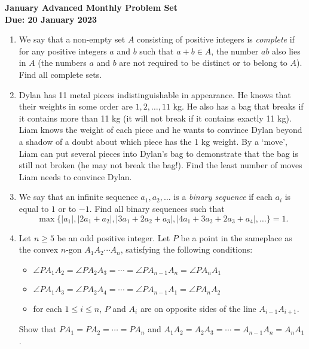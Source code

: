 \documentclass{article}
\newcommand{\abs}[1]{\left|#1\right|}
\begin{document}
\thispagestyle{empty}

\begin{center}
  \textbf{\Large January Advanced Monthly Problem Set}
  \\ \vspace{1em}
  \textbf{\large Due: 20 January 2023}
\end{center}

\bigskip

\begin{enumerate}[itemsep=\fill]

 
\item %
We say that a non-empty set $A$ consisting of positive integers is \textit{complete} if for any positive integers $a$ and $b$ such that $a+b\in A$, the number $ab$ also lies in $A$ (the numbers $a$ and $b$ are not required to be distinct or to belong to $A$). Find all complete sets.


\item %
Dylan has 11 metal pieces indistinguishable in appearance.
He knows that their weights in some order are $1,2,\dotsc,11$ kg.
He also has a bag that breaks if it contains more than 11 kg (it will not break if it contains exactly 11 kg).
Liam knows the weight of each piece and he wants to convince Dylan beyond a shadow of a doubt about which piece has the 1 kg weight.
By a `move', Liam can put several pieces into Dylan's bag to demonstrate that the bag is still not broken (he may not break the bag!).
Find the least number of moves Liam needs to convince Dylan.


\item %
We say that an infinite sequence $a_1, a_2, \dotsc$ is a \emph{binary sequence} if each $a_i$ is equal to $1$ or to $-1$.
Find all binary sequences such that \[ \max\{\abs{a_1}, \abs{2a_1+a_2}, \abs{3a_1+2a_2+a_3}, \abs{4a_1+3a_2+2a_3+a_4}, \dotsc\} = 1. \]


\item %
Let $n \geq 5$ be an odd positive integer.
Let $P$ be a point in the sameplace as the convex $n$-gon $A_1 A_2 \dotsm A_n$, satisfying the following conditions:
\begin{itemize}
	\item $\angle PA_1A_2 = \angle PA_2A_3 = \dotsb = \angle PA_{n-1}A_n = \angle PA_nA_1$
  \item $\angle PA_1A_3 =\angle PA_2A_4 = \dotsb = \angle PA_{n-1}A_1 = \angle PA_nA_2$
  \item for each $1\leq i\leq n$, $P$ and $A_i$ are on opposite sides of the line $A_{i-1}A_{i+1}$.
\end{itemize}
Show that $PA_1 = PA_2 = \dotsb = PA_n$ and $A_1A_2 = A_2A_3 = \dotsb = A_{n-1}A_n = A_nA_1$.



\end{enumerate}
\end{document}
